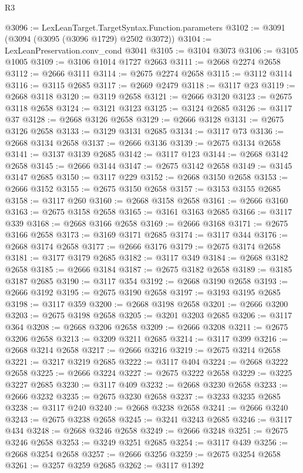 \begin{lexlean}{R3}
\begin{coremodule}
@3096 := LexLeanTarget.TargetSyntax.Function.parameters
@3102 := @3091 (@3094 (@3095 (@3096 @1729) @2502 @3072))
@3104 := LexLeanPreservation.conv_cond @3041
@3105 := @3104 @3073
@3106 := @3105 @1005
@3109 := @3106 @1014 @1727 @2663
@3111 := @2668 @2274 @2658
@3112 := @2666 @3111
@3114 := @2675 @2274 @2658
@3115 := @3112 @3114
@3116 := @3115 @2685
@3117 := @2669 @2479
@3118 := @3117 @23
@3119 := @2668 @3118
@3120 := @3119 @2658
@3121 := @2666 @3120
@3123 := @2675 @3118 @2658
@3124 := @3121 @3123
@3125 := @3124 @2685
@3126 := @3117 @37
@3128 := @2668 @3126 @2658
@3129 := @2666 @3128
@3131 := @2675 @3126 @2658
@3133 := @3129 @3131 @2685
@3134 := @3117 @73
@3136 := @2668 @3134 @2658
@3137 := @2666 @3136
@3139 := @2675 @3134 @2658
@3141 := @3137 @3139 @2685
@3142 := @3117 @123
@3144 := @2668 @3142 @2658
@3145 := @2666 @3144
@3147 := @2675 @3142 @2658
@3149 := @3145 @3147 @2685
@3150 := @3117 @229
@3152 := @2668 @3150 @2658
@3153 := @2666 @3152
@3155 := @2675 @3150 @2658
@3157 := @3153 @3155 @2685
@3158 := @3117 @260
@3160 := @2668 @3158 @2658
@3161 := @2666 @3160
@3163 := @2675 @3158 @2658
@3165 := @3161 @3163 @2685
@3166 := @3117 @339
@3168 := @2668 @3166 @2658
@3169 := @2666 @3168
@3171 := @2675 @3166 @2658
@3173 := @3169 @3171 @2685
@3174 := @3117 @344
@3176 := @2668 @3174 @2658
@3177 := @2666 @3176
@3179 := @2675 @3174 @2658
@3181 := @3177 @3179 @2685
@3182 := @3117 @349
@3184 := @2668 @3182 @2658
@3185 := @2666 @3184
@3187 := @2675 @3182 @2658
@3189 := @3185 @3187 @2685
@3190 := @3117 @354
@3192 := @2668 @3190 @2658
@3193 := @2666 @3192
@3195 := @2675 @3190 @2658
@3197 := @3193 @3195 @2685
@3198 := @3117 @359
@3200 := @2668 @3198 @2658
@3201 := @2666 @3200
@3203 := @2675 @3198 @2658
@3205 := @3201 @3203 @2685
@3206 := @3117 @364
@3208 := @2668 @3206 @2658
@3209 := @2666 @3208
@3211 := @2675 @3206 @2658
@3213 := @3209 @3211 @2685
@3214 := @3117 @399
@3216 := @2668 @3214 @2658
@3217 := @2666 @3216
@3219 := @2675 @3214 @2658
@3221 := @3217 @3219 @2685
@3222 := @3117 @404
@3224 := @2668 @3222 @2658
@3225 := @2666 @3224
@3227 := @2675 @3222 @2658
@3229 := @3225 @3227 @2685
@3230 := @3117 @409
@3232 := @2668 @3230 @2658
@3233 := @2666 @3232
@3235 := @2675 @3230 @2658
@3237 := @3233 @3235 @2685
@3238 := @3117 @240
@3240 := @2668 @3238 @2658
@3241 := @2666 @3240
@3243 := @2675 @3238 @2658
@3245 := @3241 @3243 @2685
@3246 := @3117 @434
@3248 := @2668 @3246 @2658
@3249 := @2666 @3248
@3251 := @2675 @3246 @2658
@3253 := @3249 @3251 @2685
@3254 := @3117 @439
@3256 := @2668 @3254 @2658
@3257 := @2666 @3256
@3259 := @2675 @3254 @2658
@3261 := @3257 @3259 @2685
@3262 := @3117 @1392

\end{coremodule}
\end{lexlean}

